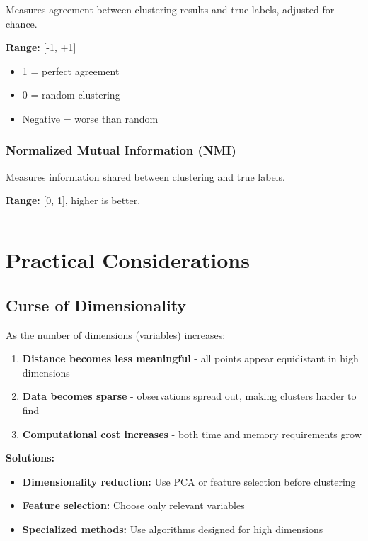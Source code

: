 \documentclass[
]{article}
\begin{document}
Measures agreement between clustering results and true labels, adjusted
for chance.

\textbf{Range:} {[}-1, +1{]}

\begin{itemize}
\item
  1 = perfect agreement
\item
  0 = random clustering
\item
  Negative = worse than random
\end{itemize}

\subsubsection{Normalized Mutual Information (NMI)}

Measures information shared between clustering and true labels.

\textbf{Range:} {[}0, 1{]}, higher is better.

\begin{center}\rule{0.5\linewidth}{0.5pt}\end{center}

\textbf{ }

\section{Practical Considerations}

\textbf{ }

\subsection{Curse of Dimensionality}

As the number of dimensions (variables) increases:

\begin{enumerate}
\item
  \textbf{Distance becomes less meaningful} - all points appear
  equidistant in high dimensions
\item
  \textbf{Data becomes sparse} - observations spread out, making
  clusters harder to find
\item
  \textbf{Computational cost increases} - both time and memory
  requirements grow
\end{enumerate}

\textbf{Solutions:}

\begin{itemize}
\item
  \textbf{Dimensionality reduction:} Use PCA or feature selection before
  clustering
\item
  \textbf{Feature selection:} Choose only relevant variables
\item
  \textbf{Specialized methods:} Use algorithms designed for high
  dimensions
\end{itemize}
\end{document}

